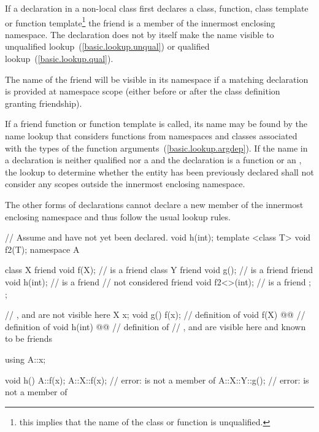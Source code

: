\pnum
If a  declaration in a non-local class first declares a
class, function, class template or function template\footnote{this implies that the name of the class or function is unqualified.}
the friend is a member of the innermost enclosing
namespace. The  declaration does not by itself make the name
visible to unqualified lookup~(\ref{basic.lookup.unqual}) or qualified
lookup~(\ref{basic.lookup.qual}). \begin{note} The name of the friend will be
visible in its namespace if a matching declaration is provided at namespace
scope (either before or after the class definition granting friendship).
\end{note} If a friend
function or function template is called, its name may be found by the
name lookup that considers functions from namespaces and classes
associated with the types of the function
arguments~(\ref{basic.lookup.argdep}). If the
name in a  declaration is neither qualified nor a
 and the declaration is a function or an
, the lookup to determine whether
the entity has been previously declared shall not consider any scopes
outside the innermost enclosing namespace. \begin{note} The other forms of
 declarations cannot declare a new member of the innermost
enclosing namespace and thus follow the usual lookup rules.
\end{note}
\begin{example}

\begin{codeblock}
// Assume  and  have not yet been declared.
void h(int);
template <class T> void f2(T);
namespace A {
  class X {
    friend void f(X);           //  is a friend
    class Y {
      friend void g();          //  is a friend
      friend void h(int);       //  is a friend
                                //  not considered
      friend void f2<>(int);    //  is a friend
    };
  };

  // ,  and  are not visible here
  X x;
  void g() { f(x); }            // definition of 
  void f(X) @@       // definition of 
  void h(int) @@    // definition of 
  // ,  and  are visible here and known to be friends
}

using A::x;

void h() {
  A::f(x);
  A::X::f(x);                   // error:  is not a member of 
  A::X::Y::g();                 // error:  is not a member of 
}
\end{codeblock}
\end{example}


